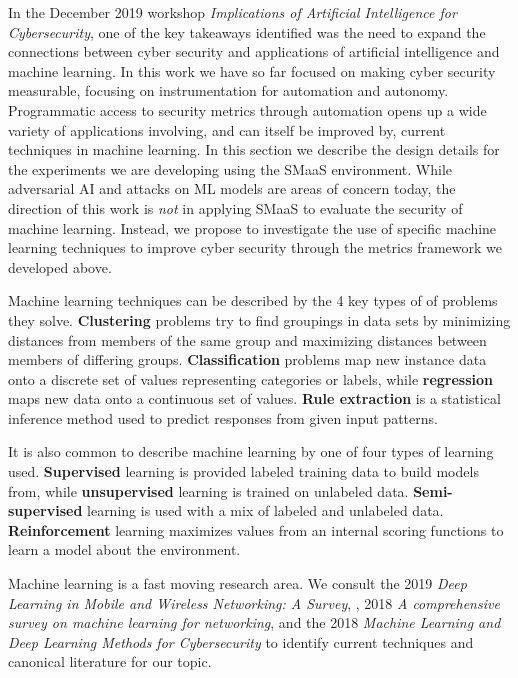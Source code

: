 In the December 2019 workshop\textit{ Implications of Artificial Intelligence for Cybersecurity}\cite{Evans_2008}, one of the key takeaways identified was the need to expand the connections between cyber security and applications of artificial intelligence and machine learning. In this work we have so far focused on making cyber security measurable, focusing on instrumentation for automation and autonomy. Programmatic access to security metrics through automation opens up a wide variety of applications involving, and can itself be improved by, current techniques in machine learning. In this section we describe the design details for the experiments we are developing using the SMaaS environment. While adversarial AI and attacks on ML models are areas of concern today, the direction of this work is \textit{not} in applying SMaaS to evaluate the security of machine learning. Instead, we propose to investigate the use of specific machine learning techniques to improve cyber security through the metrics framework we developed above. 

Machine learning techniques can be described by the 4 key types of of problems they solve. \textbf{Clustering} problems try to find groupings in data sets by minimizing distances from members of the same group and maximizing distances between members of differing groups. \textbf{Classification} problems map new instance data onto a discrete set of values representing categories or labels, while \textbf{regression} maps new data onto a continuous set of values. \textbf{Rule extraction}\cite{Denker} is a statistical 
inference method used to predict responses from given input patterns. 

It is also common to describe machine learning by one of four types of learning used. \textbf{Supervised} learning is provided labeled training data to build models from, while \textbf{unsupervised} learning is trained on unlabeled data. \textbf{Semi-supervised} learning is used with a mix of labeled and unlabeled data. \textbf{Reinforcement} learning\cite{Sutton_Barto_2018} maximizes values from an internal scoring functions to learn a model about the environment. 

Machine learning is a fast moving research area. We consult the 2019 \textit{Deep Learning in Mobile and Wireless Networking: A Survey}, \cite{Zhang_Patras_Haddadi_2019}, 2018 \textit{A comprehensive survey on machine
learning for networking}\cite{Boutaba_2018}, and the 2018 \textit{Machine Learning and Deep Learning Methods for Cybersecurity}\cite{Xin_Kong_Liu_Chen_Li_Zhu_Gao_Hou_Wang_2018} to identify current techniques and canonical literature for our topic. 

